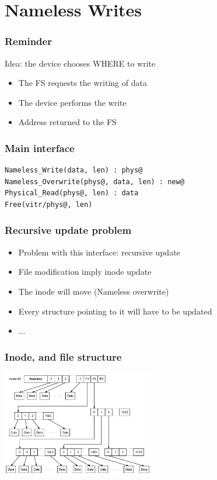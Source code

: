 \documentclass{beamer}
\begin{document}
\section{Nameless Writes}
\begin{frame}
  \frametitle{Reminder}
  Idea: the device chooses WHERE to write
  \begin{itemize}
    \item The FS requests the writing of data
    \item The device performs the write
    \item Address returned to the FS
  \end{itemize}
\end{frame}

\begin{frame}[fragile]
  \frametitle{Main interface}
  \begin{lstlisting}
Nameless_Write(data, len) : phys@
Nameless_Overwrite(phys@, data, len) : new@
Physical_Read(phys@, len) : data
Free(vitr/phys@, len)
  \end{lstlisting}
\end{frame}

\begin{frame}
  \frametitle{Recursive update problem}
  \begin{itemize}
    \item Problem with this interface: recursive update
    \item File modification imply inode update
    \item The inode will move (Nameless overwrite)
    \item Every structure pointing to it will have to be updated
    \item ...
  \end{itemize}
\end{frame}

\begin{frame}
  \frametitle{Inode, and file structure}
  \begin{center}
  \includegraphics[width=250px]{inode.png}
  \end{center}
\end{frame}
\end{document}
